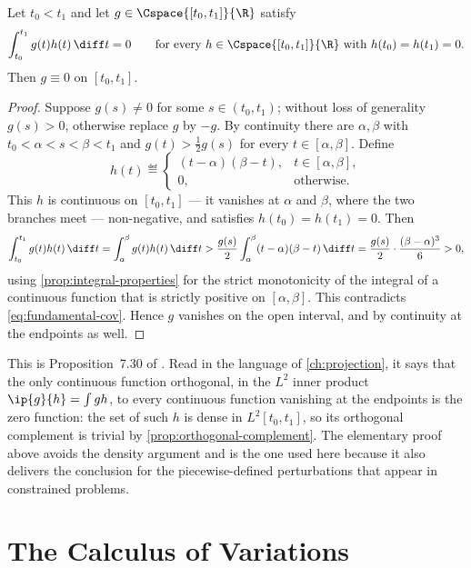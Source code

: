 \begin{lemma}\label{lem:fundamental-cov}
	Let $t_0<t_1$ and let $g\in\Cspace{[t_0,t_1]}{\R}$ satisfy
	\begin{equation}\label{eq:fundamental-cov}
		\int_{t_0}^{t_1}g(t)h(t)\,\diff t=0
		\qquad\text{for every }h\in\Cspace{[t_0,t_1]}{\R}
		\text{ with }h(t_0)=h(t_1)=0 .
	\end{equation}
	Then $g\equiv0$ on $[t_0,t_1]$.
\end{lemma}

\begin{proof}
	Suppose $g(s)\neq0$ for some $s\in(t_0,t_1)$; without loss of generality
	$g(s)>0$, otherwise replace $g$ by $-g$. By continuity there are
	$\alpha,\beta$ with $t_0<\alpha<s<\beta<t_1$ and
	$g(t)>\tfrac12g(s)$ for every $t\in[\alpha,\beta]$. Define
	\[
		h(t)\eqdef\begin{cases}(t-\alpha)(\beta-t), & t\in[\alpha,\beta], \\
              0,                            & \text{otherwise.}\end{cases}
	\]
	This $h$ is continuous on $[t_0,t_1]$ --- it vanishes at $\alpha$ and $\beta$,
	where the two branches meet --- non-negative, and satisfies
	$h(t_0)=h(t_1)=0$. Then
	\[
		\int_{t_0}^{t_1}g(t)h(t)\,\diff t
		=\int_{\alpha}^{\beta}g(t)h(t)\,\diff t
		>\frac{g(s)}{2}\int_{\alpha}^{\beta}(t-\alpha)(\beta-t)\,\diff t
		=\frac{g(s)}{2}\cdot\frac{(\beta-\alpha)^{3}}{6}>0,
	\]
	using \autoref{prop:integral-properties} for the strict monotonicity of the
	integral of a continuous function that is strictly positive on
	$[\alpha,\beta]$. This contradicts \eqref{eq:fundamental-cov}. Hence $g$
	vanishes on the open interval, and by continuity at the endpoints as well.
\end{proof}

This is Proposition~7.30 of \textcite[p.~288]{fukuda2026notes}. Read in the
language of \autoref{ch:projection}, it says that the only continuous function
orthogonal, in the $L^{2}$ inner product $\ip{g}{h}=\int g h$, to every continuous
function vanishing at the endpoints is the zero function: the set of such $h$ is
dense in $L^{2}[t_0,t_1]$, so its orthogonal complement is trivial by
\autoref{prop:orthogonal-complement}. The elementary proof above avoids the
density argument and is the one used here because it also delivers the conclusion
for the piecewise-defined perturbations that appear in constrained problems.

\section{The Calculus of Variations}\label{sec:ct-variations}

